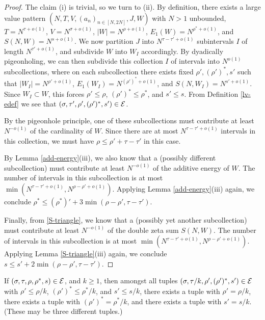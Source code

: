 \begin{proof}  The claim (i) is trivial, so we turn to (ii).  By definition, there exists a large value pattern $(N,T,V,(a_n)_{n \in [N,2N]},J,W)$ with $N > 1$ unbounded, $T = N^{\tau+o(1)}$, $V = N^{\sigma+o(1)}$, $|W| = N^{\rho+o(1)}$, $E_1(W) = N^{\rho^*+o(1)}$, and $S(N,W) = N^{s+o(1)}$.  We now partition $J$ into $N^{\tau-\tau'+o(1)}$ subintervals $I$ of length $N^{\tau'+o(1)}$, and subdivide $W$ into $W_I$ accordingly.  By dyadically pigeonholing, we can then subdivide this collection $I$ of intervals into $N^{o(1)}$ subcollections, where on each subcollection there exists fixed $\rho', (\rho')^*, s'$ such that $|W_I| = N^{\rho'+o(1)}$, $E_1(W_I) = N^{(\rho')^* + o(1)}$, and $S(N,W_I) = N^{s'+o(1)}$.  Since $W_I \subset W$, this forces $\rho' \leq \rho$, $(\rho')^* \leq \rho^*$, and $s' \leq s$.  From Definition \ref{lv-edef} we see that $(\sigma,\tau', \rho', (\rho')^*,s') \in \mathcal{E}$.

By the pigeonhole principle, one of these subcollections must contribute at least $N^{-o(1)}$ of the cardinality of $W$.  Since there are at most $N^{\tau-\tau'+o(1)}$ intervals in this collection, we must have $\rho \leq \rho' + \tau - \tau'$ in this case.

By Lemma \ref{add-energy}(iii), we also know that a (possibly different subcollection) must contribute at least $N^{-o(1)}$ of the additive energy of $W$.  The number of intervals in this subcollection is at most $\min( N^{\tau-\tau'+o(1)}, N^{\rho-\rho'+o(1)})$.  Applying Lemma \ref{add-energy}(iii) again, we conclude $\rho^* \leq (\rho^*)' + 3\min(\rho-\rho',\tau-\tau')$.

Finally, from \eqref{S-triangle}, we know that a (possibly yet another subcollection) must contribute at least $N^{-o(1)}$ of the double zeta sum $S(N,W)$. The number of intervals in this subcollection is at most $\min( N^{\tau-\tau'+o(1)}, N^{\rho-\rho'+o(1)})$.  Applying Lemma \ref{S-triangle}(iii) again, we conclude $s \leq s' + 2\min(\rho-\rho',\tau-\tau')$.
\end{proof}


\begin{lemma}\label{power-energy}  If $(\sigma,\tau,\rho,\rho^*,s) \in \mathcal{E}$, and $k \geq 1$, then amongst all tuples $(\sigma,\tau/k,\rho',(\rho')^*,s') \in \mathcal{E}$ with $\rho' \leq \rho/k$, $(\rho')^* \leq \rho^*/k$, and $s' \leq s/k$, there exists a tuple with $\rho' = \rho/k$, there exists a tuple with $(\rho')^* = \rho^*/k$, and there exists a tuple with $s' = s/k$. (These may be three different tuples.)
\end{lemma}

